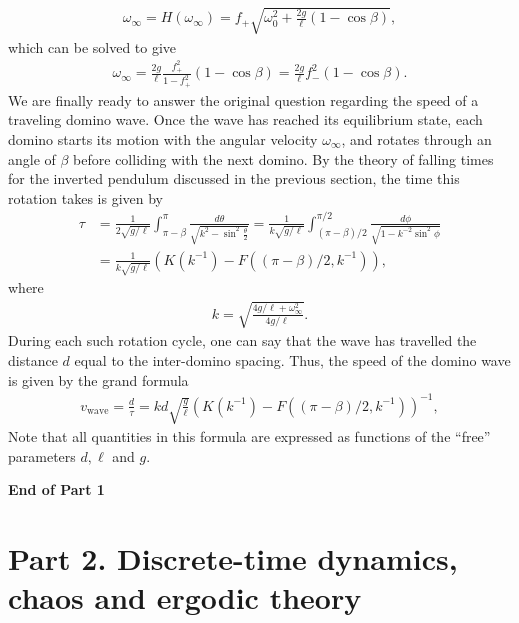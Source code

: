 \documentclass[12pt]{amsart}
\newcommand{\eqst}[1]{\begin{align*}#1\end{align*}}
\begin{document}
\eqst{ 
\omega_\infty = H(\omega_\infty) = f_+ \sqrt{\omega_0^2 + \frac{2g}{\ell}(1-\cos \beta)},
}
which can be solved to give
\eqst{
\omega_\infty = \frac{2g}{\ell}\frac{f_+^2}{1-f_+^2}(1-\cos\beta) = \frac{2g}{\ell}f_-^2(1-\cos\beta).
}
We are finally ready to answer the original question regarding the speed of a traveling domino wave. Once the wave has reached its equilibrium state, each domino starts its motion with the angular velocity $\omega_\infty$, and rotates through an angle of $\beta$ before colliding with the next domino. By the theory of falling times for the inverted pendulum discussed in the previous section, the time this rotation takes is given by
\eqst{
\tau &= \frac{1}{2\sqrt{g/\ell}} \int_{\pi-\beta}^{\pi} \frac{d\theta}{\sqrt{k^2-\sin^2\tfrac{\theta}{2}}}
= \frac{1}{k\sqrt{g/\ell}} \int_{(\pi-\beta)/2}^{\pi/2} \frac{d\phi}{\sqrt{1-k^{-2}\sin^2 \phi}}
\\ &= \frac{1}{k\sqrt{g/\ell}} \left( K(k^{-1})-F((\pi-\beta)/2,k^{-1}) \right),
}
where
\eqst{
k = \sqrt{\frac{4g/\ell+\omega_\infty^2}{4g/\ell}}.
}
During each such rotation cycle, one can say that the wave has travelled the distance $d$ equal to the inter-domino spacing. Thus, the speed of the domino wave is given by the grand formula
\eqst{
v_{\textrm{wave}} = \frac{d}{\tau} = k d \sqrt{\frac{g}{\ell}}
\left( K(k^{-1})-F((\pi-\beta)/2,k^{-1}) \right)^{-1},
}
Note that all quantities in this formula are expressed as functions of the ``free'' parameters $d, \ell$ and $g$.

\vspace{30.0pt}
\begin{center}
\textbf{End of Part 1}
\end{center}
%
%
%
%
%
%
%


\newpage

\section*{Part 2. Discrete-time dynamics, chaos and ergodic theory}
\addtocounter{section}{1}
\setcounter{subsection}{0}
\end{document}
